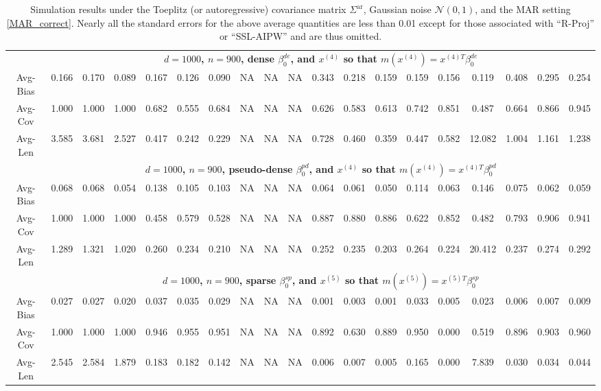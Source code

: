 \documentclass[ejsv2,noshowframe]{imsart}
\theoremstyle{plain}
\theoremstyle{definition}
\theoremstyle{remark}
\begin{document}
\begin{table}[hbtp!]
\begin{center}
{\begin{tabular}{ccccccccccccccccccc}
		& \multicolumn{18}{c}{\bf $d=1000$, $n = 900$, dense $\beta_0^{de}$, and $x^{(4)}$ so that $m(x^{(4)})=x^{(4)T}\beta_0^{de}$} \\ \cline{2-19}
		Avg-Bias & 0.166 & 0.170 & 0.089 & 0.167 & 0.126 & 0.090 & NA & NA & NA & 0.343 & 0.218 & 0.159 & 0.159 & 0.156 & 0.119 & 0.408 & 0.295 & 0.254 \\
		Avg-Cov & 1.000 & 1.000 & 1.000 & 0.682 & 0.555 & 0.684 & NA & NA & NA & 0.626 & 0.583 & 0.613 & 0.742 & 0.851 & 0.487 & 0.664 & 0.866 & 0.945 \\
		Avg-Len & 3.585 & 3.681 & 2.527 & 0.417 & 0.242 & 0.229 & NA & NA & NA & 0.728 & 0.460 & 0.359 & 0.447 & 0.582 & 12.082 & 1.004 & 1.161 & 1.238 \\
		\cline{2-19}
		& \multicolumn{18}{c}{\bf $d=1000$, $n = 900$, pseudo-dense $\beta_0^{pd}$, and $x^{(4)}$ so that $m(x^{(4)})=x^{(4)T}\beta_0^{pd}$} \\ \cline{2-19}
		Avg-Bias & 0.068 & 0.068 & 0.054 & 0.138 & 0.105 & 0.103 & NA & NA & NA & 0.064 & 0.061 & 0.050 & 0.114 & 0.063 & 0.146 & 0.075 & 0.062 & 0.059 \\
		Avg-Cov & 1.000 & 1.000 & 1.000 & 0.458 & 0.579 & 0.528 & NA & NA & NA & 0.887 & 0.880 & 0.886 & 0.622 & 0.852 & 0.482 & 0.793 & 0.906 & 0.941 \\
		Avg-Len & 1.289 & 1.321 & 1.020 & 0.260 & 0.234 & 0.210 & NA & NA & NA & 0.252 & 0.235 & 0.203 & 0.264 & 0.224 & 20.412 & 0.237 & 0.274 & 0.292 \\
		
		\hline
		& \multicolumn{18}{c}{\bf $d=1000$, $n = 900$, sparse $\beta_0^{sp}$, and $x^{(5)}$ so that $m(x^{(5)})=x^{(5)T}\beta_0^{sp}$} \\ \cline{2-19}
		Avg-Bias & 0.027 & 0.027 & 0.020 & 0.037 & 0.035 & 0.029 & NA & NA & NA & 0.001 & 0.003 & 0.001 & 0.033 & 0.005 & 0.023 & 0.006 & 0.007 & 0.009 \\
		Avg-Cov & 1.000 & 1.000 & 1.000 & 0.946 & 0.955 & 0.951 & NA & NA & NA & 0.892 & 0.630 & 0.889 & 0.950 & 0.000 & 0.519 & 0.896 & 0.903 & 0.960 \\
		Avg-Len & 2.545 & 2.584 & 1.879 & 0.183 & 0.182 & 0.142 & NA & NA & NA & 0.006 & 0.007 & 0.005 & 0.165 & 0.000 & 7.839 & 0.030 & 0.034 & 0.044 \\
		
		\hline\hline
\end{tabular}}
\caption{Simulation results under the Toeplitz (or autoregressive) covariance matrix $\Sigma^{\mathrm{ar}}$, Gaussian noise $\mathcal{N}(0,1)$, and the MAR setting \eqref{MAR_correct}. Nearly all the standard errors for the above average quantities are less than 0.01 except for those associated with ``R-Proj'' or ``SSL-AIPW'' and are thus omitted.}
\label{table:AR_MAR_res}
\end{center}
\end{table}
\end{document}
